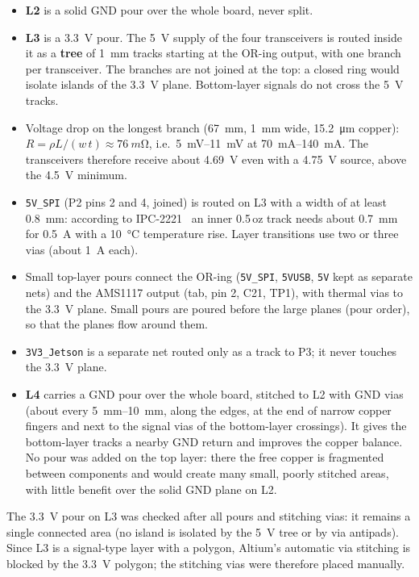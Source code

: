 \documentclass[11pt,a4paper]{article}
\newcommand{\net}[1]{\texttt{#1}}
\begin{document}
\begin{itemize}
    \item \textbf{L2} is a solid GND pour over the whole board, never split.
    \item \textbf{L3} is a \qty{3.3}{V} pour. The \qty{5}{V} supply of the four transceivers is routed inside it as a \textbf{tree} of
    \qty{1}{mm} tracks starting at the OR-ing output, with one branch per transceiver. The branches
    are not joined at the top: a closed ring would isolate islands of the \qty{3.3}{V} plane. Bottom-layer
    signals do not cross the \qty{5}{V} tracks.
    \item Voltage drop on the longest branch (\qty{67}{mm}, \qty{1}{mm} wide, \qty{15.2}{\micro m} copper): $R = \rho L/(w\,t) \approx
    \qty{76}{m\ohm}$, i.e.\ \qtyrange{5}{11}{mV} at \qtyrange{70}{140}{mA}. The transceivers therefore receive about
    \qty{4.69}{V} even with a \qty{4.75}{V} source, above the \qty{4.5}{V} minimum.
    \item \net{5V\_SPI} (P2 pins 2 and 4, joined) is routed on L3 with a width of at least \qty{0.8}{mm}: according
    to IPC-2221~\cite{ipc2221} an inner 0.5\,oz track needs about \qty{0.7}{mm} for \qty{0.5}{A} with a \qty{10}{\degreeCelsius}
    temperature rise. Layer transitions use two or three vias (about \qty{1}{A} each).
    \item Small top-layer pours connect the OR-ing (\net{5V\_SPI}, \net{5VUSB}, \net{5V} kept as separate nets) and
    the AMS1117 output (tab, pin 2, C21, TP1), with thermal vias to the \qty{3.3}{V} plane. Small
    pours are poured before the large planes (pour order), so that the planes flow around them.
    \item \net{3V3\_Jetson} is a separate net routed only as a track to P3; it never touches the \qty{3.3}{V} plane.
    \item \textbf{L4} carries a GND pour over the whole board, stitched to L2 with GND vias (about every
    \qtyrange{5}{10}{mm}, along the edges, at the end of narrow copper fingers and next to the signal
    vias of the bottom-layer crossings). It gives the bottom-layer tracks a nearby GND return
    and improves the copper balance. No pour was added on the top layer: there the free
    copper is fragmented between components and would create many small, poorly stitched
    areas, with little benefit over the solid GND plane on L2.
\end{itemize}

The \qty{3.3}{V} pour on L3 was checked after all pours and stitching vias: it remains a single connected
area (no island is isolated by the \qty{5}{V} tree or by via antipads). Since L3 is a signal-type layer
with a polygon, Altium's automatic via stitching is blocked by the \qty{3.3}{V} polygon; the stitching
vias were therefore placed manually.
\end{document}
